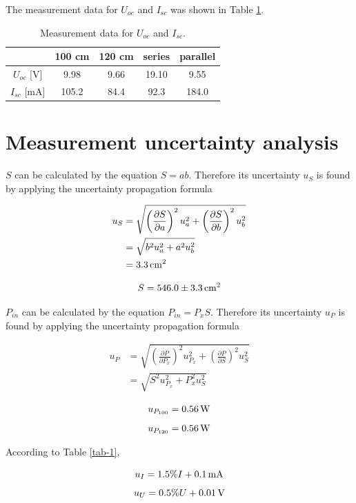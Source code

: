 \documentclass{article}
\begin{document}
{{The measurement data for $U_{oc}$ and $I_{sc}$ was shown in Table \ref{tab-4}.

\begin{table}[!h]
\begin{center}
\begin{tabular}{|c|c|c|c|c|}
\hline
& 100 cm & 120 cm & series & parallel \\
\hline
$U_{oc}$ [V] & 9.98 & 9.66 & 19.10 & 9.55\\
\hline
$I_{sc}$ [mA] & 105.2 & 84.4 & 92.3 & 184.0 \\
\hline
\end{tabular}
\caption{Measurement data for $U_{oc}$ and $I_{sc}$.}
\label{tab-4}
\end{center}
\end{table}

\newpage



\newpage

\section{Measurement uncertainty analysis}

$S$ can be calculated by the equation $S=ab$. Therefore its uncertainty $u_S$ is found by applying the uncertainty propagation formula

\begin{align*}
u_S&=\sqrt{\left(\frac{\partial S}{\partial a}\right)^2u_a^2+\left(\frac{\partial S}{\partial b}\right)^2u_{b}^2}\\
&=\sqrt{b^2u_a^2+a^2u_b^2}\\
&=3.3\,\rm cm^2
\end{align*}

$$S=546.0\pm3.3\,\rm cm^2$$

$P_{in}$ can be calculated by the equation $P_{in}=P_xS$. Therefore its uncertainty $u_P$ is found by applying the uncertainty propagation formula

\begin{align*}
u_P&=\sqrt{\left(\frac{\partial P}{\partial P_x}\right)^2u_{P_x}^2+\left(\frac{\partial P}{\partial S}\right)^2u_{S}^2}\\
&=\sqrt{S^2u_{P_x}^2+P_x^2u_S^2}
\end{align*}

$$u_{P_{100}}=0.56\,\rm W$$
$$u_{P_{120}}=0.56\,\rm W$$

According to Table \ref{tab-1},

$$u_I=1.5\%I+0.1\,\rm mA$$
$$u_U=0.5\%U+0.01\,\rm V$$

}}
\end{document}

